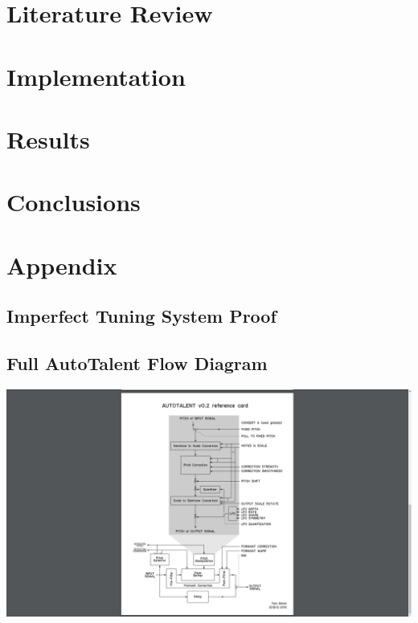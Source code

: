 \documentclass[12pt, twoside, openright]{report}
\begin{document}
\chapter{Literature Review}


\chapter{Implementation}


\chapter{Results}


\chapter{Conclusions}


{\footnotesize{}}


\chapter*{Appendix}
\setcounter{section}{0}
\renewcommand\thesection{\Alph{section})}
\pagestyle{plain}

\section{Imperfect Tuning System Proof}


\newpage

\section{Full AutoTalent Flow Diagram}
\vfill
\includegraphics[width=\textwidth, trim={20cm 1cm 20cm 3.5cm},clip]
{AutoTalentFlowDiagram}
\vfill
\end{document}
